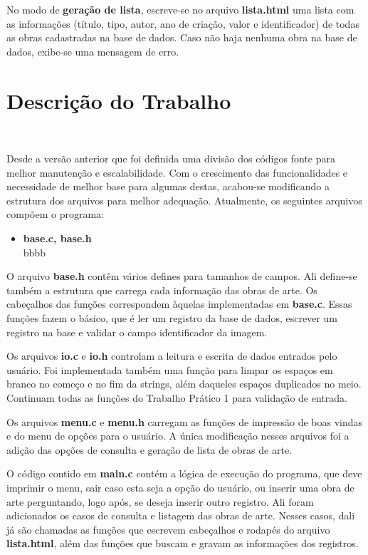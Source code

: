 \documentclass{article}
\begin{document}
No modo de \textbf{geração de lista}, escreve-se no arquivo \textbf{lista.html} uma lista com as informações (título, tipo, autor, ano de criação, valor e identificador) de todas as obras cadastradas na base de dados. Caso não haja nenhuma obra na base de dados, exibe-se uma mensagem de erro.

\section{Descrição do Trabalho}\

Desde a versão anterior que foi definida uma divisão dos códigos fonte para melhor manutenção e escalabilidade. Com o crescimento das funcionalidades e necessidade de melhor base para algumas destas, acabou-se modificando a estrutura dos arquivos para melhor adequação. Atualmente, os seguintes arquivos compõem o programa:

\begin{itemize}
 \item \textbf{base.c, base.h}\\
       bbbb
\end{itemize}

O arquivo \textbf{base.h} contêm vários defines para tamanhos de campos. Ali define-se também a estrutura que carrega cada informação das obras de arte. Os cabeçalhos das funções correspondem àquelas implementadas em \textbf{base.c}. Essas funções fazem o básico, que é ler um registro da base de dados, escrever um registro na base e validar o campo identificador da imagem.

Os arquivos \textbf{io.c} e \textbf{io.h} controlam a leitura e escrita de dados entrados pelo usuário. Foi implementada também uma função para limpar os espaços em branco no começo e no fim da strings, além daqueles espaços duplicados no meio. Continuam todas as funções do Trabalho Prático 1 para validação de entrada.

Os arquivos \textbf{menu.c} e \textbf{menu.h} carregam as funções de impressão de boas vindas e do menu de opções para o usuário. A única modificação nesses arquivos foi a adição das opções de consulta e geração de lista de obras de arte.

O código contido em \textbf{main.c} contém a lógica de execução do programa, que deve imprimir o menu, sair caso esta seja a opção do usuário, ou inserir uma obra de arte perguntando, logo após, se deseja inserir outro registro. Ali foram adicionados os casos de consulta e listagem das obras de arte. Nesses casos, dali já são chamadas as funções que escrevem cabeçalhos e rodapés do arquivo \textbf{lista.html}, além das funções que buscam e gravam as informações dos registros.
\end{document}
